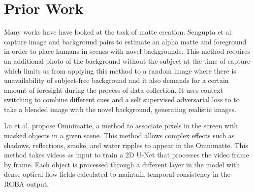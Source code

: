 \documentclass{article}
\begin{document}




\section{Prior Work}
Many works have have looked at the task of matte creation. Sengupta et al.\cite{BMSengupta20} capture image and background pairs to estimate an alpha matte and foreground in order to place humans in scenes with novel backgrounds. This method requires an additional photo of the background without the subject at the time of capture which limits us from applying this method to a random image where there is unavailability of subject-free background and it also demands for a certain amount of foresight during the process of data collection. It uses context switching to combine different cues and a self supervised adversarial loss to to take a blended image with the novel background, generating realistic images.

Lu et al.\cite{lu2021} propose Omnimatte, a method to associate pixels in the screen with masked objects in a given scene. This method allows complex effects such as shadows, reflections, smoke, and water ripples to appear in the Omnimatte. This method takes videos as input to train a 2D U-Net that processes the video frame by frame. Each object is processed through a different layer in the model with dense optical flow fields calculated to maintain temporal consistency in the RGBA output.
\end{document}
